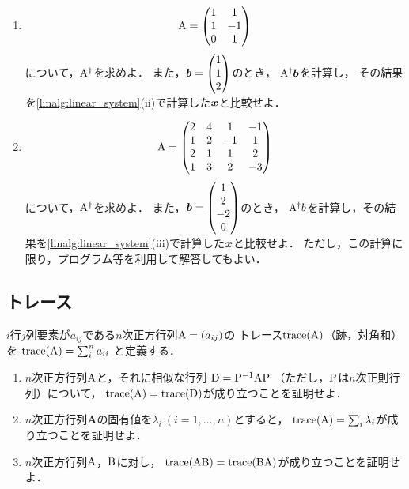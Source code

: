  \begin{enumerate}[label=(\roman*)]
    \item
      \begin{equation}
        \mathrm{A} =
          \begin{pmatrix}
            1 & 1 \\
            1 & -1 \\
            0 & 1
          \end{pmatrix}
      \end{equation}
      について，$\mathrm{A}^\dagger$を求めよ．
      また，$\boldsymbol{b} = \begin{pmatrix} 1 \\ 1 \\ 2 \end{pmatrix}$のとき，
      $\mathrm{A}^\dagger \boldsymbol{b}$を計算し，
      その結果を\ref{linalg:linear_system}(ii)で計算した$\boldsymbol{x}$と比較せよ．
  
    \item
      \begin{equation}
        \mathrm{A} =
          \begin{pmatrix}
            2 & 4 & 1 & -1 \\
            1 & 2 & -1 & 1 \\
            2 & 1 & 1 & 2 \\
            1 & 3 & 2 & -3
          \end{pmatrix}
      \end{equation}
      について，$\mathrm{A}^\dagger$を求めよ．
      また，$\boldsymbol{b}=\begin{pmatrix} 1 \\ 2 \\ -2 \\ 0 \end{pmatrix}$のとき，
      $\mathrm{A}^\dagger b$を計算し，その結果を\ref{linalg:linear_system}(iii)で計算した$\boldsymbol{x}$と比較せよ．
      ただし，この計算に限り，プログラム等を利用して解答してもよい．
  \end{enumerate}

\subsection{トレース}
    $i$行$j$列要素が$a_{ij}$である$n$次正方行列$\mathrm{A}=(a_{ij})$の
    トレース$\operatorname{trace}(\mathrm{A})$（跡，対角和）を
    $\operatorname{trace}(\mathrm{A}) = \sum_i^n a_{ii}$
    と定義する．
    \begin{enumerate}[label=(\roman*)]
      \item $n$次正方行列$\mathrm{A}$と，それに相似な行列
        $\mathrm{D} = \mathrm{P}^{-1}\mathrm{A}\mathrm{P}$
        （ただし，$\mathrm{P}$は$n$次正則行列）について，
        $\operatorname{trace}(\mathrm{A}) = \operatorname{trace}(\mathrm{D})$が成り立つことを証明せよ．
      \item $n$次正方行列${\boldsymbol A}$の固有値を$\lambda_i\ (i=1,\ldots,n)$とすると，
        $\operatorname{trace}(\mathrm{A}) = \sum_i \lambda_i$が成り立つことを証明せよ．
      \item $n$次正方行列$\mathrm{A}$，$\mathrm{B}$に対し，
        $\operatorname{trace}(\mathrm{A}\mathrm{B}) = \operatorname{trace}(\mathrm{B}\mathrm{A})$が成り立つことを証明せよ．
    \end{enumerate}

